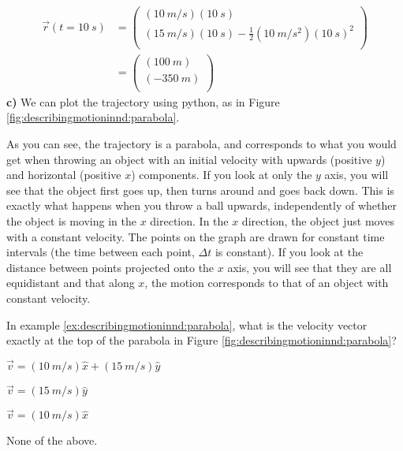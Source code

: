 \begin{example}
\begin{align*}
\vec r(t=\SI{10}{s})&= \begin{pmatrix}
           (\SI{10}{m/s})(\SI{10}{s}) \\
           (\SI{15}{m/s})(\SI{10}{s})-\frac{1}{2}(\SI{10}{m/s^2})(\SI{10}{s})^2 \\
         \end{pmatrix}\\
         &= \begin{pmatrix}
           (\SI{100}{m}) \\
           (\SI{-350}{m})\\
         \end{pmatrix}
\end{align*}
\textbf{c)} We can plot the trajectory using python, as in Figure \ref{fig:describingmotioninnd:parabola}.

As you can see, the trajectory is a parabola, and corresponds to what you would get when throwing an object with an initial velocity with upwards (positive $y$) and horizontal (positive $x$) components. If you look at only the $y$ axis, you will see that the object first goes up, then turns around and goes back down. This is exactly what happens when you throw a ball upwards, independently of whether the object is moving in the $x$ direction. In the $x$ direction, the object just moves with a constant velocity. The points on the graph are drawn for constant time intervals (the time between each point, $\Delta t$ is constant). If you look at the distance between points projected onto the $x$ axis, you will see that they are all equidistant and that along $x$, the motion corresponds to that of an object with constant velocity. 
\end{example}
\newpage
\begin{checkpoint}{\begin{MCquestion}{In example \ref{ex:describingmotioninnd:parabola}, what is the velocity vector exactly at the top of the parabola in Figure \ref{fig:describingmotioninnd:parabola}?}
\item $\vec v=(\SI{10}{m/s})\hat x+(\SI{15}{m/s})\hat y$
\item $\vec v=(\SI{15}{m/s})\hat y$
\item $\vec v=(\SI{10}{m/s})\hat x$ \correct
\item None of the above.
\end{MCquestion}}
\end{checkpoint}
